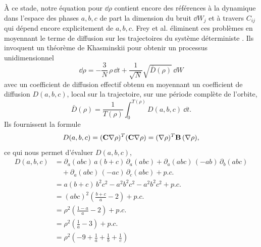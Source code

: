 \documentclass[openany,a4paper,12pt]{article}
\begin{document}
\par À ce stade, notre équation pour $\dd \rho$ contient encore des références à la dynamique dans l'espace des phases $a,b,c$ de part la dimension du bruit $\dd W_j$ et à travers $C_{ij}$ qui dépend encore explicitement de $a,b,c$. Frey et al. éliminent ces problèmes en moyennant le terme de diffusion sur les trajectoires du système déterministe \cite{frey2012}. Ils invoquent un théorème de Khasminskii \cite{khasminskij1968} pour obtenir un processus unidimensionnel
%
\begin{equation}\label{averaging_drho_final}
	\dd \rho = -\frac 3N \,\rho\,\dd t + \frac{1}{\sqrt{N}} \sqrt{\bar D(\rho)} \,\dd W
\end{equation}
%  
avec un coefficient de diffusion effectif obtenu en moyennant un coefficient de diffusion $D(a,b,c)$, local sur la trajectoire, sur une période complète de l'orbite,
%
\begin{equation}\label{D_rho_from_D_abc}
	\bar D(\rho) = \frac{1}{T(\rho)} \int_0^{T(\rho)} D(a,b,c) \ \dd t.
\end{equation}
%
Ils fournissent la formule
%
\begin{equation}\label{formule_D_abc}
	D(a,b,c) = (\bold C \bold \nabla\rho)^T(\bold C \bold \nabla\rho) = (\bold \nabla\rho)^T \bold B \, (\bold \nabla\rho),
\end{equation}
%
ce qui nous permet d'évaluer $D(a,b,c)$,
%
\begin{equation}\label{eval_D_abc}
\begin{split}
	D(a,b,c) 
	&= \partial_a(abc) \, a(b+c) \, \partial_a(abc) 
	+ \partial_a(abc) \, (-ab) \, \partial_b(abc) \\
	&\quad + \partial_a(abc) \, (-ac) \, \partial_c(abc) + p.c. \\
	&= a(b+c) \, b^2c^2 - a^2b^2c^2 - a^2b^2c^2 + p.c. \\
	&= (abc)^2 \left( \frac{b+c}{a}-2 \right)  + p.c. \\ 
	&= \rho^2 \left( \frac{1-a}{a}-2 \right)  + p.c. \\
	&= \rho^2 \left( \frac{1}{a}-3 \right)  + p.c. \\
	&= \rho^2 \left( -9 + \frac 1a + \frac 1b + \frac 1c \right) 
\end{split}
\end{equation}
%
\end{document}
